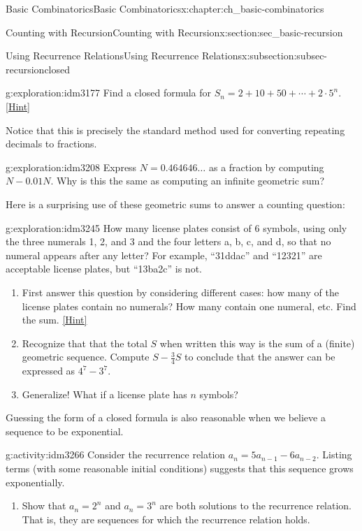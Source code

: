 \documentclass[oneside,10pt,]{book}
\numberwithin{equation}{chapter}
\begin{document}
\begin{chapterptx}{Basic Combinatorics}{}{Basic Combinatorics}{}{}{x:chapter:ch_basic-combinatorics}
\begin{sectionptx}{Counting with Recursion}{}{Counting with Recursion}{}{}{x:section:sec_basic-recursion}
\begin{subsectionptx}{Using Recurrence Relations}{}{Using Recurrence Relations}{}{}{x:subsection:subsec-recursionclosed}
\begin{exploration}{}{g:exploration:idm3177}%
Find a closed formula for \(S_n = 2 + 10 + 50 + \cdots + 2\cdot 5^n\).%
\space\hspace*{0pt}\hfill{\tiny\hyperlink{g:hint:idm3181-back}{[Hint]}}\end{exploration}
Notice that this is precisely the standard method used for converting repeating decimals to fractions.%
\begin{exploration}{}{g:exploration:idm3208}%
Express \(N = 0.464646\ldots\) as a fraction by computing \(N - 0.01N\).  Why is this the same as computing an infinite geometric sum?%
\end{exploration}
Here is a surprising use of these geometric sums to answer a counting question:%
\begin{exploration}{}{g:exploration:idm3245}%
How many license plates consist of 6 symbols, using only the three numerals 1, 2, and 3 and the four letters a, b, c, and d, so that no numeral appears after any letter?  For example, ``31ddac'' and ``12321'' are acceptable license plates, but ``13ba2c'' is not.%
\begin{enumerate}[font=\bfseries,label=(\alph*),ref=\alph*]
\item{}First answer this question by considering different cases: how many of the license plates contain no numerals?  How many contain one numeral, etc.  Find the sum.%
\space\hspace*{0pt}\hfill{\tiny\hyperlink{g:hint:idm3254-back}{[Hint]}}\item{}Recognize that that the total \(S\) when written this way is the sum of a (finite) geometric sequence.  Compute \(S - \frac{3}{4}S\) to conclude that the answer can be expressed as \(4^7 - 3^7\).%
\item{}Generalize! What if a license plate has \(n\) symbols?%
\end{enumerate}
\end{exploration}
Guessing the form of a closed formula is also reasonable when we believe a sequence to be exponential.%
\begin{activity}{}{g:activity:idm3266}%
Consider the recurrence relation \(a_n = 5a_{n-1} - 6a_{n-2}\).  Listing terms (with some reasonable initial conditions) suggests that this sequence grows exponentially.%
\begin{enumerate}[font=\bfseries,label=(\alph*),ref=\alph*]
\item{}Show that \(a_n = 2^n\) and \(a_n = 3^n\) are both solutions to the recurrence relation.  That is, they are sequences for which the recurrence relation holds.%

\end{enumerate}
\end{activity}
\end{subsectionptx}
\end{sectionptx}
\end{chapterptx}
\end{document}
